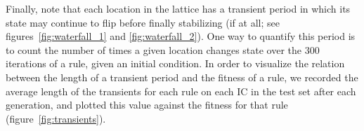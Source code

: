 
Finally, note that each location in the lattice has a transient period in which its state may continue to flip before finally stabilizing (if at all; see figures~\ref{fig:waterfall_1} and \ref{fig:waterfall_2}). One way to quantify this period is to count the number of times a given location changes state 
over the 300 iterations of a rule, given an initial condition. In order to visualize the relation between the length of a transient period and the fitness of a rule, 
we recorded the average length of the transients for each rule on each IC in the test set after each generation, and plotted this value against the fitness 
for that rule (figure~\ref{fig:transients}).

